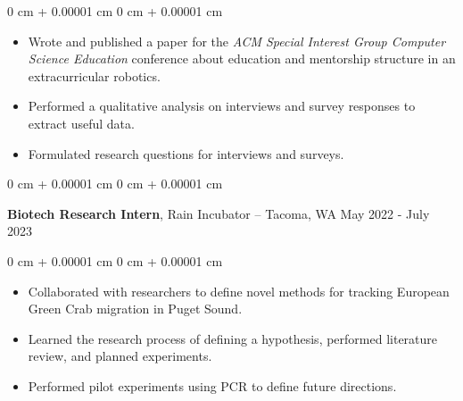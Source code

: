 \documentclass[10pt, article]{article}
\newenvironment{highlights}{
    \begin{itemize}[
        topsep=0.10 cm,
        parsep=0.10 cm,
        partopsep=0pt,
        itemsep=0pt,
        leftmargin=0 cm + 10pt
    ]
}{
    \end{itemize}
} %
\newenvironment{onecolentry}{
    \begin{adjustwidth}{
        0 cm + 0.00001 cm
    }{
        0 cm + 0.00001 cm
    }
}{
    \end{adjustwidth}
} %
\newenvironment{twocolentry}[2][]{
    \onecolentry
    \def\secondColumn{#2}
    \setcolumnwidth{\fill, 4.5 cm}
    \begin{paracol}{2}
}{
    \switchcolumn \raggedleft \secondColumn
    \end{paracol}
    \endonecolentry
} %
\begin{document}
        \vspace{0.20 cm}
        \begin{onecolentry}
            \begin{highlights}
            \item Wrote and published a paper for the \textit{ACM Special Interest Group Computer Science Education} conference about education and mentorship structure in an extracurricular robotics.
              \item Performed a qualitative analysis on interviews and survey responses to extract useful data.
              \item Formulated research questions for interviews and surveys.
            \end{highlights}
        \end{onecolentry}
        \vspace{0.2 cm}
        \begin{twocolentry}{ 
            May 2022 - July 2023

          }
        \textbf{Biotech Research Intern}, Rain Incubator -- Tacoma, WA\end{twocolentry}
        \vspace{0.2 cm}
        \begin{onecolentry}
          \begin{highlights}
          \item Collaborated with researchers to define novel methods for tracking European Green Crab migration in Puget Sound.
          \item Learned the research process of defining a hypothesis, performed literature review, and planned experiments.
          \item Performed pilot experiments using PCR to define future directions.

          \end{highlights}
        \end{onecolentry}
\end{document}
